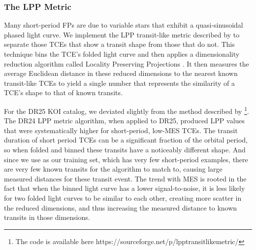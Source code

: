 

\subsubsection{The LPP Metric}
\label{s:lpp}

Many short-period FPs are due to variable stars that exhibit a quasi-sinusoidal phased light curve. We implement the LPP transit-like metric described by \citet{Thompson2015b} to separate those TCEs that show a transit shape from those that do not. This technique bins the TCE's folded light curve and then applies a dimensionality reduction algorithm called Locality Preserving Projections \citep[LPP, ][]{He2004}.  It then measures the average Euclidean distance in these reduced dimensions to the nearest known transit-like TCEs to yield a single number that represents the similarity of a TCE's shape to that of known transits. 

For the DR25 KOI catalog, we deviated slightly from the method described by \citet{Thompson2015b}\footnote{The code is available here https://sourceforge.net/p/lpptransitlikemetric/}.  The DR24 LPP metric algorithm, when applied to DR25, produced LPP values that were systematically higher for short-period, low-MES TCEs. The transit duration of short period TCEs can be a significant fraction of the orbital period, so when folded and binned these transits have a noticeably different shape. And since we use  as our training set, which has very few short-period examples, there are very few known transits for the algorithm to match to, causing large measured distances for these transit event. The trend with MES is rooted in the fact that when the binned light curve has a lower signal-to-noise, it is less likely for two folded light curves to be similar to each other, creating more scatter in the reduced dimensions, and thus increasing the measured distance to known transits in those dimensions.  

